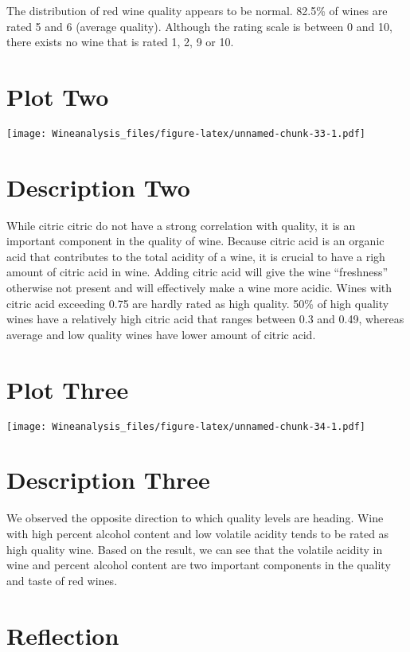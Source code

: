 \documentclass[]{article}
\begin{document}
The distribution of red wine quality appears to be normal. 82.5\% of
wines are rated 5 and 6 (average quality). Although the rating scale is
between 0 and 10, there exists no wine that is rated 1, 2, 9 or 10.

\section{Plot Two}\label{plot-two}

\texttt{[image: Wineanalysis\_files/figure-latex/unnamed-chunk-33-1.pdf]}

\section{Description Two}\label{description-two}

While citric citric do not have a strong correlation with quality, it is
an important component in the quality of wine. Because citric acid is an
organic acid that contributes to the total acidity of a wine, it is
crucial to have a righ amount of citric acid in wine. Adding citric acid
will give the wine ``freshness'' otherwise not present and will
effectively make a wine more acidic. Wines with citric acid exceeding
0.75 are hardly rated as high quality. 50\% of high quality wines have a
relatively high citric acid that ranges between 0.3 and 0.49, whereas
average and low quality wines have lower amount of citric acid.

\section{Plot Three}\label{plot-three}

\texttt{[image: Wineanalysis\_files/figure-latex/unnamed-chunk-34-1.pdf]}

\section{Description Three}\label{description-three}

We observed the opposite direction to which quality levels are heading.
Wine with high percent alcohol content and low volatile acidity tends to
be rated as high quality wine. Based on the result, we can see that the
volatile acidity in wine and percent alcohol content are two important
components in the quality and taste of red wines.

\section{Reflection}\label{reflection}
\end{document}
